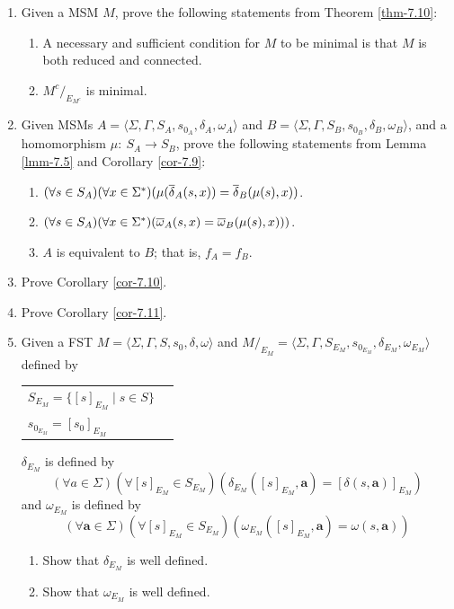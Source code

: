 \begin{enumerate}[{7.}1.]
\item Given a MSM $M$, prove the following statements from Theorem \ref{thm-7.10}:
\begin{enumerate}
\item A necessary and sufficient condition for $M$ to be minimal is that $M$ is
both reduced and connected.
\item $M^c/  _{E_{M^c}}$ is minimal.
\end{enumerate}

\item Given MSMs $A=\langle\Sigma,\Gamma,S_A,s_{0_A},\delta_A,\omega_A\rangle$
and $B=\langle\Sigma,\Gamma,S_B,s_{0_B},\delta_B,\omega_B\rangle$, and a
homomorphism $\mu$$:\ S_A \rightarrow S_B$, prove the following statements from
Lemma \ref{lmm-7.5} and Corollary \ref{cor-7.9}:
\begin{enumerate}
\item $(\forall s \in S_A)(\forall x \in \Sigma^*)(\mu(\overline{\delta}_A(s,x)) =
	\overline{\delta}_B(\mu(s),x))$.
\item $(\forall s \in S_A)(\forall x \in \Sigma^*)(\overline{\omega}_A(s,x) =
	\overline{\omega}_B(\mu(s),x)))$.
\item $A$ is equivalent to $B$; that is, $f_A = f_B$.
\end{enumerate}

\item Prove Corollary \ref{cor-7.10}.

\item Prove Corollary \ref{cor-7.11}.

\item Given a FST $M=\langle\Sigma,\Gamma,S,s_0,\delta,\omega\rangle$ and
$M/  _{E_M}=\langle\Sigma,\Gamma,S_{E_M},s_{0_{E_M}},\delta_{E_M},\omega_{E_M}
\rangle$ defined by
\begin{center}\begin{tabular}{ll}
$S_{E_M} =\{[s]_{E_M} \mid s \in S\}$ \\
$s_{0_{E_M}} = [s_0]_{E_M}$
\end{tabular}\end{center}
$\delta_{E_M}$ is defined by
\[ (\forall a \in \Sigma)(\forall [s]_{E_M} \in S_{E_M})(\delta_{E_M}([s]_{E_M},
	\pmb{a}) = [\delta(s,\pmb{a})]_{E_M}) \]
and $\omega_{E_M}$ is defined by
\[ (\forall\pmb{a}\in\Sigma)(\forall [s]_{E_M} \in S_{E_M})(\omega_{E_M}
	([s]_{E_M},\pmb{a}) = \omega(s,\pmb{a})) \]
\begin{enumerate}
\item Show that $\delta_{E_M}$ is well defined.
\item Show that $\omega_{E_M}$ is well defined.
\end{enumerate}


\end{enumerate}
